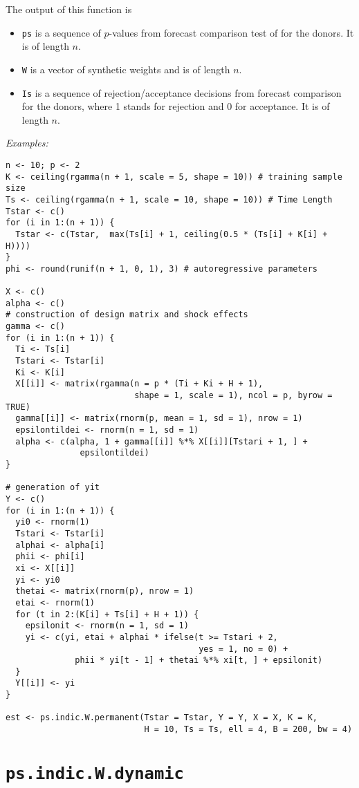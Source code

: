 \documentclass[12pt]{article}
\begin{document}
 The output of this function is
 \begin{itemize}
 	\item \texttt{ps} is a sequence of $p$-values from forecast comparison test of   for the donors. It is of length $n$.
 	\item \texttt{W} is a vector of synthetic weights and is of length $n$.
 	\item  \texttt{Is} is a sequence of rejection/acceptance decisions from forecast comparison for the donors, where 1 stands for rejection and 0 for acceptance. It is of length $n$.
 \end{itemize}
 
 
 \emph{Examples:}
 
 \begin{verbatim}
n <- 10; p <- 2
K <- ceiling(rgamma(n + 1, scale = 5, shape = 10)) # training sample size
Ts <- ceiling(rgamma(n + 1, scale = 10, shape = 10)) # Time Length
Tstar <- c()
for (i in 1:(n + 1)) {
  Tstar <- c(Tstar,  max(Ts[i] + 1, ceiling(0.5 * (Ts[i] + K[i] + H))))
}
phi <- round(runif(n + 1, 0, 1), 3) # autoregressive parameters

X <- c()
alpha <- c()
# construction of design matrix and shock effects
gamma <- c()
for (i in 1:(n + 1)) {
  Ti <- Ts[i]
  Tstari <- Tstar[i]
  Ki <- K[i]
  X[[i]] <- matrix(rgamma(n = p * (Ti + Ki + H + 1),
                          shape = 1, scale = 1), ncol = p, byrow = TRUE) 
  gamma[[i]] <- matrix(rnorm(p, mean = 1, sd = 1), nrow = 1)
  epsilontildei <- rnorm(n = 1, sd = 1)
  alpha <- c(alpha, 1 + gamma[[i]] %*% X[[i]][Tstari + 1, ] +
               epsilontildei)
}

# generation of yit
Y <- c()
for (i in 1:(n + 1)) {
  yi0 <- rnorm(1)
  Tstari <- Tstar[i]
  alphai <- alpha[i]
  phii <- phi[i]
  xi <- X[[i]]
  yi <- yi0
  thetai <- matrix(rnorm(p), nrow = 1)
  etai <- rnorm(1)
  for (t in 2:(K[i] + Ts[i] + H + 1)) {
    epsilonit <- rnorm(n = 1, sd = 1)
    yi <- c(yi, etai + alphai * ifelse(t >= Tstari + 2, 
                                       yes = 1, no = 0) +
              phii * yi[t - 1] + thetai %*% xi[t, ] + epsilonit)
  }
  Y[[i]] <- yi
}

est <- ps.indic.W.permanent(Tstar = Tstar, Y = Y, X = X, K = K, 
                            H = 10, Ts = Ts, ell = 4, B = 200, bw = 4)
 \end{verbatim}
 
 \section{\texttt{ps.indic.W.dynamic}}
 
\end{document}
